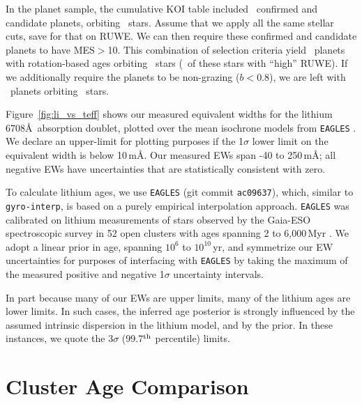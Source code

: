 \documentclass[11pt,twocolumn,tighten]{aastex63}
\begin{document}
In the planet sample, the cumulative KOI table included
\nnonfpcumkois\ confirmed and candidate planets, orbiting
\nnonfpcumkoihosts\ stars.  Assume that we apply all the same stellar
cuts, save for that on RUWE.  We can then require these confirmed and
candidate planets to have MES$>$10.  This combination of selection
criteria yield \nplwgyroagewithgrazingandhighruwe\ planets with
rotation-based ages orbiting
\nplhoststarwgyroagewithgrazingandhighruwe\ stars
(\nplhoststarwgyroagejusthighruwe\ of these stars with ``high'' RUWE).
If we additionally require the planets to be non-grazing ($b<0.8$), we
are left with \nplwgyroagenograzing\ planets orbiting
\nplhoststarwgyroagenograzing\ stars.


Figure~\ref{fig:li_vs_teff} shows our measured equivalent widths for
the lithium 6708\AA\ absorption doublet, plotted over the mean
isochrone models from \texttt{EAGLES} \citep{Jeffries_2023}.  We
declare an upper-limit for plotting purposes if the 1$\sigma$ lower
limit on the equivalent width is below 10\,m\AA.  Our measured EWs
span -40 to 250\,m\AA; all negative EWs have uncertainties that are
statistically consistent with zero.

To calculate lithium ages, we use \texttt{EAGLES} (git commit
\texttt{ac09637}), which, similar to \texttt{gyro-interp}, is based on
a purely empirical interpolation approach.  \texttt{EAGLES} 
was calibrated on lithium measurements of stars observed by the
Gaia-ESO spectroscopic survey in 52 open clusters with ages spanning 2
to 6{,}000\,Myr \citep{Jeffries_2023}.  We adopt a linear prior in
age, spanning $10^6$ to $10^{10}$\,yr, and symmetrize our EW
uncertainties for purposes of interfacing with \texttt{EAGLES} by
taking the maximum of the measured positive and negative 1$\sigma$
uncertainty intervals.

In part because many of our EWs are upper limits, many of the lithium
ages are lower limits.  In such cases,  the inferred age posterior is
strongly influenced by the assumed intrinsic dispersion in
the lithium model, and by the prior.  In these instances, we
quote the 3$\sigma$ (99.7$^{\rm th}$ percentile) limits.




\section{Cluster Age Comparison}
\label{sec:litagecomparison}
\end{document}
